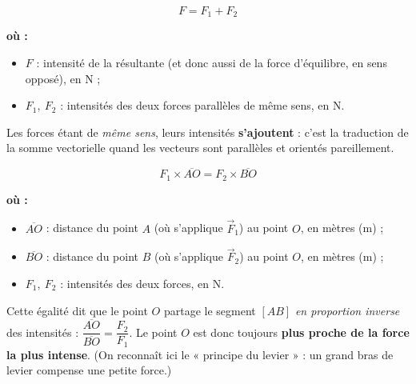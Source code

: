\documentclass[11pt,a4paper]{article}
\newenvironment{ou}{%
  \par\smallskip\noindent\textbf{où :}\nopagebreak
  \begin{itemize}[leftmargin=1.8em,topsep=2pt,itemsep=1.5pt,parsep=0pt]}%
  {\end{itemize}}
\newcommand{\vv}[1]{\vec{#1}}
\begin{document}
\begin{formule}
\[
\boxed{\;F = F_1 + F_2\;}
\]
\begin{ou}
  \item $F$ : intensité de la résultante (et donc aussi de la force d'équilibre, en sens opposé), en \si{\newton} ;
  \item $F_1,\ F_2$ : intensités des deux forces parallèles de même sens, en \si{\newton}.
\end{ou}
Les forces étant de \emph{même sens}, leurs intensités \textbf{s'ajoutent} : c'est la traduction de la
somme vectorielle quand les vecteurs sont parallèles et orientés pareillement.
\end{formule}

\begin{formule}
\[
\boxed{\;F_1\times \overline{AO} = F_2\times \overline{BO}\;}
\]
\begin{ou}
  \item $\overline{AO}$ : distance du point $A$ (où s'applique $\vv F_1$) au point $O$, en mètres (\si{\metre}) ;
  \item $\overline{BO}$ : distance du point $B$ (où s'applique $\vv F_2$) au point $O$, en mètres (\si{\metre}) ;
  \item $F_1,\ F_2$ : intensités des deux forces, en \si{\newton}.
\end{ou}
Cette égalité dit que le point $O$ partage le segment $[AB]$ \emph{en proportion inverse} des
intensités : $\dfrac{\overline{AO}}{\overline{BO}} = \dfrac{F_2}{F_1}$. Le point $O$ est donc toujours
\textbf{plus proche de la force la plus intense}. (On reconnaît ici le « principe du levier » : un
grand bras de levier compense une petite force.)
\end{formule}
\end{document}
